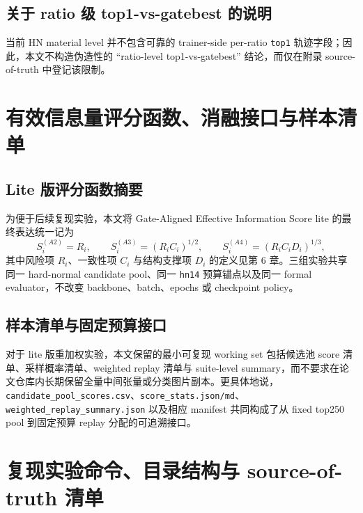 \documentclass[UTF8,openany,12pt]{ctexbook}
\newcommand{\formalmetric}[1]{\texttt{#1}}
\begin{document}
\section{关于 ratio 级 top1-vs-gatebest 的说明}
当前 HN material level 并不包含可靠的 trainer-side per-ratio \formalmetric{top1} 轨迹字段；因此，本文不构造伪造性的 “ratio-level top1-vs-gatebest” 结论，而仅在附录 source-of-truth 中登记该限制。

\chapter{有效信息量评分函数、消融接口与样本清单}

\section{Lite 版评分函数摘要}
为便于后续复现实验，本文将 Gate-Aligned Effective Information Score lite 的最终表达统一记为
\begin{equation}
S_i^{(A2)} = R_i,\qquad
S_i^{(A3)} = (R_i C_i)^{1/2},\qquad
S_i^{(A4)} = (R_i C_i D_i)^{1/3},
\end{equation}
其中风险项 $R_i$、一致性项 $C_i$ 与结构支撑项 $D_i$ 的定义见第 6 章。三组实验共享同一 hard-normal candidate pool、同一 \texttt{hn14} 预算锚点以及同一 formal evaluator，不改变 backbone、batch、epochs 或 checkpoint policy。

\section{样本清单与固定预算接口}
对于 lite 版重加权实验，本文保留的最小可复现 working set 包括候选池 score 清单、采样概率清单、weighted replay 清单与 suite-level summary，而不要求在论文仓库内长期保留全量中间张量或分类图片副本。更具体地说，\texttt{candidate\_pool\_scores.csv}、\texttt{score\_stats.json/md}、\texttt{weighted\_replay\_summary.json} 以及相应 manifest 共同构成了从 fixed top250 pool 到固定预算 replay 分配的可追溯接口。

\chapter{复现实验命令、目录结构与 source-of-truth 清单}
\end{document}
